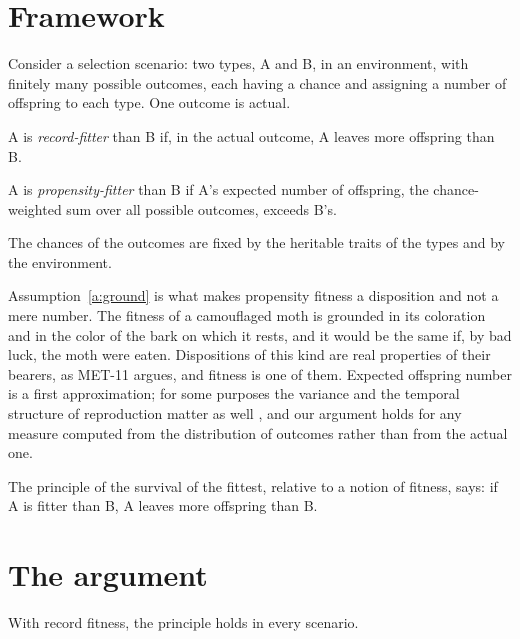 \documentclass{situationist-preprint}
\begin{document}
\section{Framework}

Consider a selection scenario: two types, A and B, in an environment, with finitely many possible outcomes, each having a chance and assigning a number of offspring to each type. One outcome is actual.

\begin{definition}\label{d:record}
A is \emph{record-fitter} than B if, in the actual outcome, A leaves more offspring than B.
\end{definition}

\begin{definition}\label{d:propensity}
A is \emph{propensity-fitter} than B if A's expected number of offspring, the chance-weighted sum over all possible outcomes, exceeds B's.
\end{definition}

\begin{assumption}[Grounding]\label{a:ground}
The chances of the outcomes are fixed by the heritable traits of the types and by the environment.
\end{assumption}

Assumption~\ref{a:ground} is what makes propensity fitness a disposition and not a mere number. The fitness of a camouflaged moth is grounded in its coloration and in the color of the bark on which it rests, and it would be the same if, by bad luck, the moth were eaten. Dispositions of this kind are real properties of their bearers, as MET-11 argues, and fitness is one of them. Expected offspring number is a first approximation; for some purposes the variance and the temporal structure of reproduction matter as well \citep{BeattyFinsen1989}, and our argument holds for any measure computed from the distribution of outcomes rather than from the actual one.

The principle of the survival of the fittest, relative to a notion of fitness, says: if A is fitter than B, A leaves more offspring than B.

\section{The argument}

\begin{proposition}\label{p:record}
With record fitness, the principle holds in every scenario.
\end{proposition}
\end{document}
